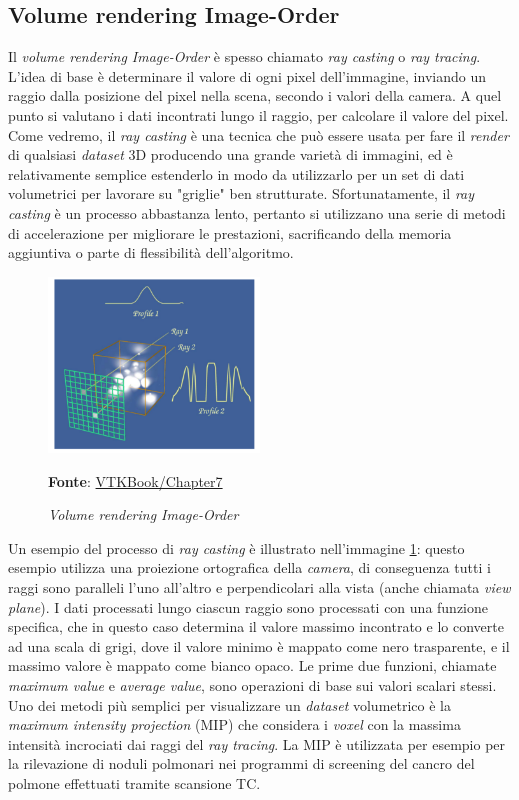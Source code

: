 \subsection{Volume rendering Image-Order}\label{sec:volume-image-order}
Il \emph{volume rendering Image-Order} è spesso chiamato \emph{ray casting} o \emph{ray tracing}. L'idea di base è determinare il valore di ogni pixel dell'immagine, inviando un raggio dalla posizione del pixel nella scena, secondo i valori della camera. A quel punto si  valutano i dati incontrati lungo il raggio, per calcolare il valore del pixel. Come vedremo, il \emph{ray casting} è una tecnica che può essere usata per fare il \emph{render} di qualsiasi \emph{dataset} 3D producendo una grande varietà di immagini, ed è relativamente semplice estenderlo in modo da utilizzarlo per un set di dati volumetrici per lavorare su "griglie" ben strutturate. Sfortunatamente, il \emph{ray casting} è un processo abbastanza lento, pertanto si utilizzano una serie di metodi di accelerazione per migliorare le prestazioni, sacrificando della memoria aggiuntiva o parte di flessibilità dell'algoritmo.

\begin{figure}[h]
    \centering
    \includegraphics[width=0.5\textwidth]{immagini/volumerendering/imageorder.png}
    \caption{\textit{Volume rendering Image-Order}}
    \textbf{Fonte}: \href{https://lorensen.github.io/VTKExamples/site/VTKBook/07Chapter7/}{VTKBook/Chapter7}
    \label{fig: Volume Rendering Image-Order}
\end{figure}

Un esempio del processo di \emph{ray casting} è illustrato nell'immagine \ref{fig: Volume Rendering Image-Order}: questo esempio utilizza una proiezione ortografica della \emph{camera}, di conseguenza tutti i raggi sono paralleli l'uno all'altro e perpendicolari alla vista (anche chiamata \emph{view plane}).
I dati processati lungo ciascun raggio sono processati con una funzione specifica, che in questo caso determina il valore massimo incontrato e lo converte ad una scala di grigi, dove il valore minimo è mappato come nero trasparente, e il massimo valore è mappato come bianco opaco. Le prime due funzioni, chiamate \emph{maximum value} e \emph{average value}, sono operazioni di base sui valori scalari stessi. Uno dei metodi più semplici per visualizzare un \emph{dataset} volumetrico è la \emph{maximum intensity projection} (MIP) che considera i \emph{voxel} con la massima intensità incrociati dai raggi del \emph{ray tracing}. La MIP è utilizzata per esempio per la rilevazione di noduli polmonari nei programmi di screening del cancro del polmone effettuati tramite scansione TC.

